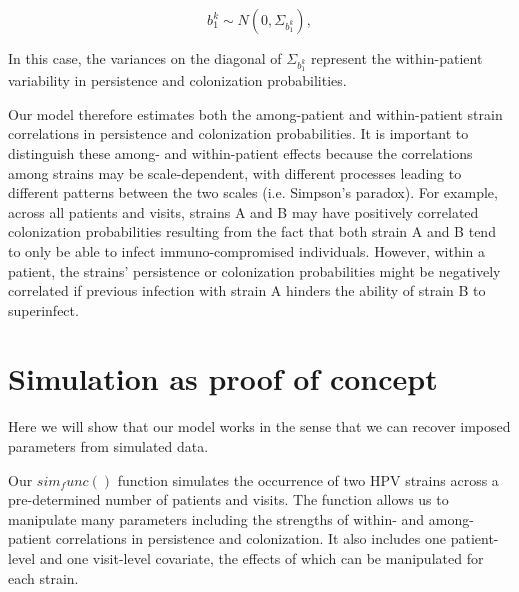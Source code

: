 \documentclass{article}
\begin{document}
$$ b^k_1 \sim N(0, \Sigma_{b^k_{1}}), $$

In this case, the variances on the diagonal of $\Sigma_{b^k_{1}}$ represent the within-patient variability in persistence and colonization probabilities.

Our model therefore estimates both the among-patient and within-patient strain correlations in persistence and colonization probabilities. It is important to distinguish these among- and within-patient effects because the correlations among strains may be scale-dependent, with different processes leading to different patterns between the two scales (i.e. Simpson's paradox). For example, across all patients and visits, strains A and B may have positively correlated colonization probabilities resulting from the fact that both strain A and B tend to only be able to infect immuno-compromised individuals. However, within a patient, the strains' persistence or colonization probabilities might be negatively correlated if previous infection with strain A hinders the ability of strain B to superinfect. 

\section*{Simulation as proof of concept}

Here we will show that our model works in the sense that we can recover imposed parameters from simulated data. 

Our $sim_func()$ function simulates the occurrence of two HPV strains across a pre-determined number of patients and visits. The function allows us to manipulate many parameters including the strengths of within- and among-patient correlations in persistence and colonization. It also includes one patient-level and one visit-level covariate, the effects of which can be manipulated for each strain.
\end{document}
